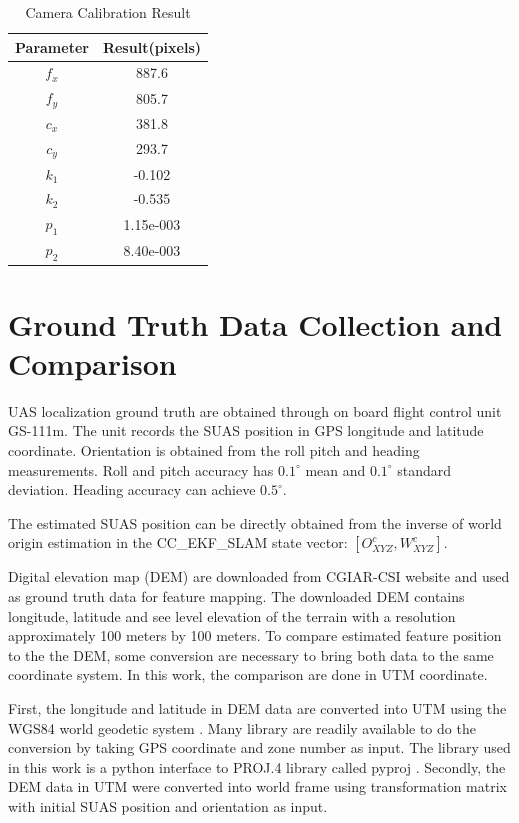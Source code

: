 \begin{table}
\caption{Camera Calibration Result}
\label{tab:camcalresult}
\centering
\begin{tabular}{|c|c|}
\hline
Parameter & Result(pixels)\\ \hline
$f_x$ & 887.6 \\ \hline
$f_y$ & 805.7\\ \hline
$c_x$ & 381.8 \\ \hline
$c_y$ & 293.7 \\ \hline
$k_1$ & -0.102 \\ \hline
$k_2$ & -0.535 \\ \hline
$p_1$ & 1.15e-003 \\ \hline
$p_2$ & 8.40e-003 \\
\hline
\end{tabular}
\end{table}
\FloatBarrier

\section{Ground Truth Data Collection and Comparison}

UAS localization ground truth are obtained through on board flight
control unit GS-111m. The unit records the SUAS position in GPS
longitude and latitude coordinate. Orientation is obtained from the
roll pitch and heading measurements. Roll and pitch accuracy has
$0.1^\circ$ mean and $0.1^\circ$ standard deviation. Heading accuracy can
achieve $0.5^\circ$.\cite{_athena_????}

The estimated SUAS position can be directly obtained from the inverse
of world origin estimation in the CC\_EKF\_SLAM state vector:
$[O_{XYZ}^{c}, W_{XYZ}^{c}]$.

Digital elevation map (DEM) are downloaded from CGIAR-CSI website
\cite{_cgiar-csi_????} and used as ground truth data for feature
mapping. The downloaded DEM contains longitude, latitude and see level
elevation of the terrain with a resolution approximately 100 meters by
100 meters. To compare estimated feature position to the the DEM, some
conversion are necessary to bring both data to the same coordinate
system. In this work, the comparison are done in UTM coordinate. 

First, the longitude and latitude in DEM data are converted into UTM
using the WGS84 world geodetic system \cite{_world_????}. Many library
are readily available to do the conversion by taking GPS coordinate
and zone number as input. The library used in this work is a python
interface to PROJ.4 library \cite{_pyproj_????} called pyproj
\cite{_pyproj_????}. Secondly, the DEM data in UTM were converted into
world frame using transformation matrix with initial SUAS position and
orientation as input.

